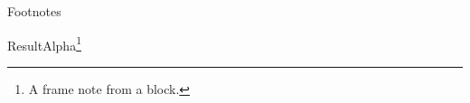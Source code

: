 \documentclass[aspectratio=169]{beamer}
\begin{document}
\begin{frame}{Footnotes}
\begin{block}{Result}Alpha\footnote{A frame note from a block.}\end{block}
\end{frame}
\end{document}
